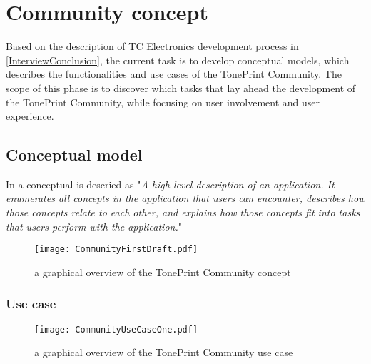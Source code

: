 \chapter{Community concept}
\label{CommunityConcept}
Based on the description of TC Electronics development process in \autoref{InterviewConclusion}, the current task is to develop conceptual models, which describes the functionalities and use cases of the TonePrint Community. The scope of this phase is to discover which tasks that lay ahead the development of the TonePrint Community, while focusing on user involvement and user experience. \\

\section{Conceptual model}
\label{ConceptualModel}
In \parencite[][17]{PDF:Henderson2012} a conceptual is descried  as "\textit{A high-level description of an application. It enumerates all concepts in the application that users can encounter, describes how those concepts relate to each other, and explains
how those concepts fit into tasks that users perform with the application.}"

\begin{figure}[H]
	\centering
	\texttt{[image: CommunityFirstDraft.pdf]}
	\caption{a graphical overview of the TonePrint Community concept}
	\label{fig:CommunityConceptualModel}
\end{figure}

\subsection{Use case}

\begin{figure}[H]
	\centering
	\texttt{[image: CommunityUseCaseOne.pdf]}
	\caption{a graphical overview of the TonePrint Community use case}
	\label{fig:CommunityConceptualUseCase}
\end{figure}